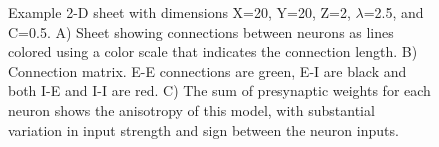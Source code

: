 \begin{figure}[!htb]
 \caption{Example 2-D sheet with dimensions X=20, Y=20, Z=2, $\lambda$=2.5, and C=0.5. A)  Sheet showing connections between neurons as lines colored using a color scale that indicates the connection length. 
 B)  Connection matrix. E-E connections are green, E-I are black and both I-E and I-I  are red. 
 C) The sum of presynaptic weights for each neuron shows the anisotropy of this model, with substantial variation in input strength and sign between the neuron inputs.}
 \label{fig:sheet_structure}
\end{figure}

